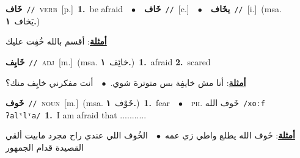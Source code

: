 \documentclass[10pt,a4paper,twoside]{article} %
\begin{document}
\begin{multicols}{2}
{\setlength\topsep{0pt}\textbf{\foreignlanguage{arabic}{خَاف}}\ {\color{gray}\texttt{//}\color{black}}\ \textsc{verb}\ [p.]\ \textbf{1.}~be afraid\ \ $\bullet$\ \ \setlength\topsep{0pt}\textbf{\foreignlanguage{arabic}{خَاف}}\ {\color{gray}\texttt{//}\color{black}}\ [c.]\ \ $\bullet$\ \ \setlength\topsep{0pt}\textbf{\foreignlanguage{arabic}{يخَاف}}\ {\color{gray}\texttt{//}\color{black}}\ [i.]\ \color{gray}(msa. \foreignlanguage{arabic}{يَخاف}~\foreignlanguage{arabic}{\textbf{١.}})\color{black}\  \begin{flushright}\color{gray}\foreignlanguage{arabic}{\textbf{\underline{\foreignlanguage{arabic}{أمثلة}}}: أقسم بالله خُفِت عليك}\end{flushright}\color{black}} \vspace{2mm}

{\setlength\topsep{0pt}\textbf{\foreignlanguage{arabic}{خَايِف}}\ {\color{gray}\texttt{//}\color{black}}\ \textsc{adj}\ [m.]\ \color{gray}(msa. \foreignlanguage{arabic}{خائِف}~\foreignlanguage{arabic}{\textbf{١.}})\color{black}\ \textbf{1.}~afraid  \textbf{2.}~scared\  \begin{flushright}\color{gray}\foreignlanguage{arabic}{\textbf{\underline{\foreignlanguage{arabic}{أمثلة}}}: أنا مش خايفِة بس متوترة شوي.\ $\bullet$\ \  أنت مفكرني خايِِف منك؟}\end{flushright}\color{black}} \vspace{2mm}

{\setlength\topsep{0pt}\textbf{\foreignlanguage{arabic}{خَوف}}\ {\color{gray}\texttt{//}\color{black}}\ \textsc{noun}\ [m.]\ \color{gray}(msa. \foreignlanguage{arabic}{خَوْف}~\foreignlanguage{arabic}{\textbf{١.}})\color{black}\ \textbf{1.}~fear\ \ $\bullet$\ \ \textsc{ph.} \color{gray} \foreignlanguage{arabic}{خَوف الله}\color{black}\ {\color{gray}\texttt{/{\sffamily xoːf ʔalˤlˤa}/}\color{black}}\ \textbf{1.}~I am afraid that ...........\  \begin{flushright}\color{gray}\foreignlanguage{arabic}{\textbf{\underline{\foreignlanguage{arabic}{أمثلة}}}: خَوف الله يطلع واطي زي عمه\ $\bullet$\ \  الخُوف اللي عندي راح مجرد مابيت ألقي القصيدة قدام الجمهور}\end{flushright}\color{black}} \vspace{2mm}


\end{multicols}
\end{document}
